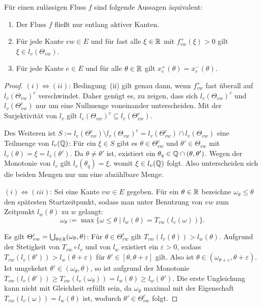 \begin{lemma}\label{lemma-only-active-edges}
	Für einen zulässigen Fluss $f$ sind folgende Aussagen äquivalent:
	\begin{enumerate}[label=(\roman*)]
		\item Der Fluss $f$ fließt nur entlang aktiver Kanten.
		\item Für jede Kante $vw\in E$ und für fast alle $\xi\in\mathbb{R}$ mit	$f_{vw}^+(\xi)>0$ gilt $\xi \in l_v(\Theta_{vw})$.
		\item Für jede Kante $e\in E$ und für alle $\theta\in\mathbb{R}$ gilt $x_e^+(\theta) = x_e^-(\theta)$.
	\end{enumerate}
\end{lemma}
\begin{proof}
	$(i) \Leftrightarrow (ii)$: Bedingung~(ii) gilt genau dann, wenn $f_{vw}^+$ fast überall auf $l_v(\Theta_{vw})^c$ verschwindet.
	Daher genügt es, zu zeigen, dass sich $l_v(\Theta_{vw})^c$ und $l_v(\Theta_{vw}^c)$ nur um eine Nullmenge voneinander unterscheiden.
	Mit der Surjektivität von $l_v$ gilt $l_v(\Theta_{vw})^c\subseteq l_v(\Theta_{vw}^c)$.
	
	Des Weiteren ist $S:=l_v(\Theta_{vw}^c)\setminus l_v(\Theta_{vw})^c = l_v(\Theta_{vw}^c)\cap l_v(\Theta_{vw})$ eine Teilmenge von $l_v(\mathbb{Q})$:
	Für ein $\xi\in S$ gibt es $\theta\in\Theta_{vw}^c$ und $\theta'\in\Theta_{vw}$ mit $l_v(\theta)=\xi=l_v(\theta')$.
	Da $\theta\neq\theta'$ ist, existiert ein $\theta_q\in\mathbb{Q}\cap(\theta,\theta')$.
	Wegen der Monotonie von $l_v$ gilt $l_v(\theta_q)=\xi$, womit $\xi\in l_v(\mathbb{Q})$ folgt.
	Also unterscheiden sich die beiden Mengen nur um eine abzählbare Menge.
	
	$(i)\Leftrightarrow (iii)$: Sei eine Kante $vw\in E$ gegeben.
	Für ein $\theta\in\mathbb{R}$ bezeichne $\omega_\theta\leq \theta$ den spätesten Startzeitpunkt, sodass man unter Benutzung von $vw$ zum Zeitpunkt $l_w(\theta)$ zu $w$ gelangt:
	\[ \omega_\theta:=\max\{ \omega\leq\theta \mid l_w(\theta) = T_{vw}(l_v(\omega)) \}. \]
	
	Es gilt $\Theta_{vw}^c = \bigcup_{\theta\in\mathbb{R}} (\omega_\theta, \theta)$:
	Für $\theta\in\Theta_{vw}^c$ gilt $T_{vw}(l_v(\theta)) > l_w(\theta)$.
	Aufgrund der Stetigkeit von $T_{vw}\circ l_v$ und von $l_w$ existiert ein $\varepsilon>0$, sodass $T_{vw}(l_v(\theta')) > l_w(\theta+\varepsilon)$ für $\theta'\in[\theta,\theta+\varepsilon]$ gilt.
	Also ist $\theta\in(\omega_{\theta+\varepsilon}, \theta+\varepsilon)$.
	Ist umgekehrt $\theta'\in (\omega_\theta,\theta)$, so ist aufgrund der Monotonie $T_{vw}(l_v(\theta'))\geq T_{vw}(l_v(\omega_\theta)) = l_w(\theta)\geq l_w(\theta')$.
	Die erste Ungleichung kann nicht mit Gleichheit erfüllt sein, da $\omega_\theta$ maximal mit der Eigenschaft $T_{vw}(l_v(\omega)) = l_w(\theta)$ ist, wodurch $\theta'\in\Theta_{vw}^c$ folgt.
	

\end{proof}
